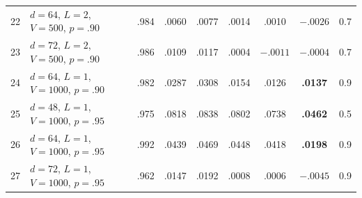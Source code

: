 \begin{table}[t]
\begin{tabular}{@{}cl c cc cc c c@{}}
\midrule
22 & $d\!=\!64$, $L\!=\!2$, $V\!=\!500$, $p\!=\!.90$ & .984 & .0060 & .0077 & .0014 & .0010 & \textbf{$-.0026$} & 0.7 \\
23 & $d\!=\!72$, $L\!=\!2$, $V\!=\!500$, $p\!=\!.90$ & .986 & .0109 & .0117 & .0004 & $-.0011$ & \textbf{$-.0004$} & 0.7 \\
\midrule
24 & $d\!=\!64$, $L\!=\!1$, $V\!=\!1000$, $p\!=\!.90$ & .982 & .0287 & .0308 & .0154 & .0126 & \textbf{.0137} & 0.9 \\
25 & $d\!=\!48$, $L\!=\!1$, $V\!=\!1000$, $p\!=\!.95$ & .975 & .0818 & .0838 & .0802 & .0738 & \textbf{.0462} & 0.5 \\
26 & $d\!=\!64$, $L\!=\!1$, $V\!=\!1000$, $p\!=\!.95$ & .992 & .0439 & .0469 & .0448 & .0418 & \textbf{.0198} & 0.9 \\
27 & $d\!=\!72$, $L\!=\!1$, $V\!=\!1000$, $p\!=\!.95$ & .962 & .0147 & .0192 & .0008 & .0006 & \textbf{$-.0045$} & 0.9 \\
\bottomrule
\end{tabular}
\end{table}
